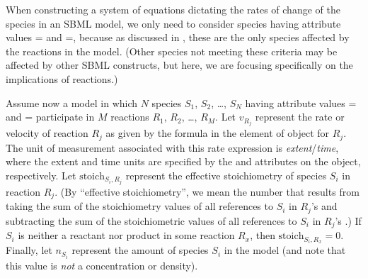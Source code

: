 When constructing a system of equations dictating the rates of
change of the species in an SBML model, we only need to consider
species having attribute values = and
=, because as discussed in
, these are the only species
affected by the reactions in the model.  (Other species not
meeting these criteria may be affected by other SBML constructs,
but here, we are focusing specifically on the implications of
reactions.)

\newcommand{\si}{\ensuremath{S_i}\xspace}
\newcommand{\nsi}{\ensuremath{n_{S_i}}\xspace}
\newcommand{\rj}{\ensuremath{R_j}\xspace}
\newcommand{\rx}{\ensuremath{R_x}\xspace}
\newcommand{\vrj}{\ensuremath{v_{R_j}}\xspace}
\newcommand{\stoichij}{\ensuremath{\textrm{stoich}_{S_{i},R_{j}}}\xspace}
\newcommand{\stoichix}{\ensuremath{\textrm{stoich}_{S_{i},R_{x}}}\xspace}
\newcommand{\csi}{\ensuremath{c_{S_i}}\xspace}
\newcommand{\csg}{\ensuremath{c_{\,\textrm{model}}}\xspace}

Assume now a model in which $N$ species $S_{1}$, $S_{2}$,
\ldots{}, $S_{N}$ having attribute values
= and
= participate in $M$ reactions
$R_{1}$, $R_{2}$, \ldots{}, $R_{M}$.  Let \vrj represent the rate
or velocity of reaction \rj as given by the formula in the
 element of \KineticLaw object for \rj.  The unit of
measurement associated with this rate expression is
\emph{extent}/\emph{time}, where the extent and time units are
specified by the  and 
attributes on the \Model object, respectively.  Let \stoichij
represent the effective stoichiometry of species \si in reaction
\rj.  (By ``effective stoichiometry'', we mean the number that
results from taking the sum of the stoichiometry values of all
references to \si in \rj's  and subtracting
the sum of the stoichiometric values of all references to \si in
\rj's .)  If \si is neither a reactant nor
product in some reaction \rx, then $\stoichix\!= 0$.  Finally, let
\nsi represent the amount of species \si in the model (and note
that this value is \emph{not} a concentration or density).

